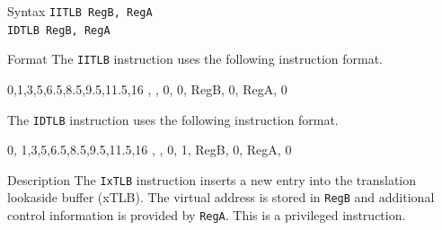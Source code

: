 %
%
\pagebreak
{}

\begin{iPageDescEntry}{Syntax}
    \texttt{IITLB RegB, RegA} \\
    \texttt{IDTLB RegB, RegA}
\end{iPageDescEntry}

\begin{iPageDescEntry}{Format}
    The \texttt{IITLB} instruction uses the following instruction format. \\

    \begin{flushleft}
    \drawInstrFormat
        {0,1,3,5,6.5,8.5,9.5,11.5,16}
        {\OpCodeGrpSYS, \OpCodePTLB, 0, 0, RegB, 0, RegA, 0}
    \end{flushleft}
    
    The \texttt{IDTLB} instruction uses the following instruction format. \\

    \begin{flushleft}
    \drawInstrFormat
        {0, 1,3,5,6.5,8.5,9.5,11.5,16}
        {\OpCodeGrpSYS, \OpCodePTLB, 0, 1, RegB, 0, RegA, 0}
    \end{flushleft}

\end{iPageDescEntry}

\begin{iPageDescEntry}{Description}
    The \texttt{IxTLB} instruction inserts a new entry into the translation lookaside buffer (xTLB). The virtual address is stored in \texttt{RegB} and additional control information is provided by \texttt{RegA}. This is a privileged instruction.
\end{iPageDescEntry}

